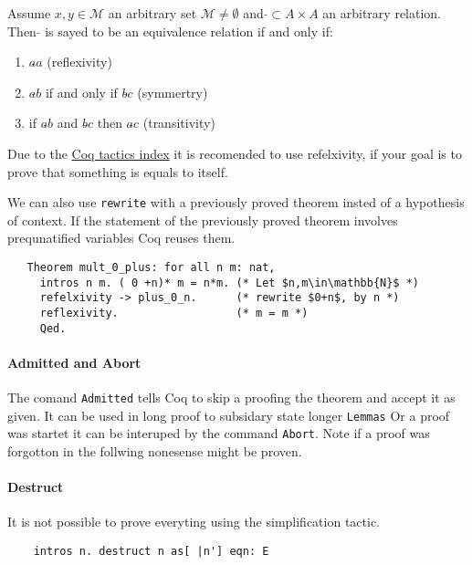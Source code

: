    
   \begin{definition}
   Assume $x,y\in \mathcal{M}$ an arbitrary set $\mathcal{M}\neq\emptyset$ and $\tilde{}\subset A \times A $ an arbitrary relation.
   Then $\tilde{}$ is sayed to be an equivalence relation if and only if:
   \begin{enumerate}
   \item $a\tilde{} a$ (reflexivity)
   \item $a\tilde{} b$ if and only if $b \tilde{} c$ (symmertry)
   \item if $a\tilde{} b$ and $ b\tilde{} c$ then $a\tilde{} c$ (transitivity) 
   \end{enumerate}
   \end{definition}
     
   Due to the \href{https://pjreddie.com/coq-tactics/}{Coq tactics index} it is recomended to use refelxivity, if your goal is to prove that something is equals to itself.  
   
   We can also use \lstinline!rewrite! with a previously proved theorem insted of a hypothesis of context.
   If the statement of the previously proved theorem involves prequnatified variables Coq reuses them.
   
   \begin{lstlisting}
   Theorem mult_0_plus: for all n m: nat,
     intros n m. ( 0 +n)* m = n*m. (* Let $n,m\in\mathbb{N}$ *) 
     refelxivity -> plus_0_n.      (* rewrite $0+n$, by n *)
     reflexivity.                  (* m = m *)
     Qed.
   \end{lstlisting}   

	\paragraph{Admitted and Abort}
	
	The comand \lstinline!Admitted! tells Coq to skip a proofing the theorem and accept it as given.
	It can be used in long proof to subsidary state longer \lstinline!Lemmas!  Or a proof was startet it can be interuped by the command \lstinline!Abort!.
	Note if a proof was forgotton in the follwing nonesense might be proven. \\
	
   \paragraph{Destruct}	
	It is not possible to prove everyting using the simplification tactic.   
	\begin{lstlisting}
	intros n. destruct n as[ |n'] eqn: E
	\end{lstlisting}

   